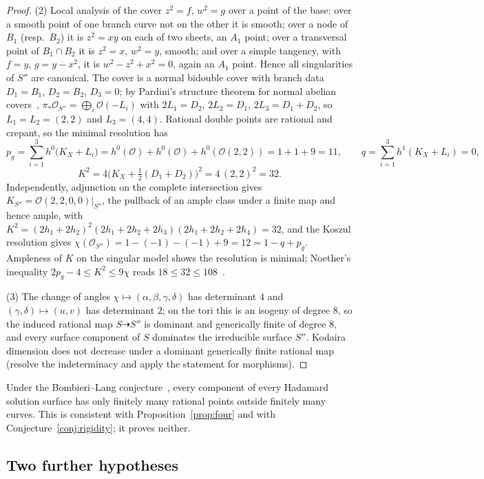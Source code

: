 \begin{proof}
(2) Local analysis of the cover $z^2=f$, $w^2=g$ over a point of the base: over a smooth point of one branch curve not on
the other it is smooth; over a node of $B_1$ (resp.\ $B_2$) it is $z^2=xy$ on each of two sheets, an $A_1$ point; over a
transversal point of $B_1\cap B_2$ it is $z^2=x$, $w^2=y$, smooth; and over a simple tangency, with $f=y$, $g=y-x^2$, it is
$w^2-z^2+x^2=0$, again an $A_1$ point. Hence all singularities of $S''$ are canonical. The cover is a normal bidouble cover
with branch data $D_1=B_1$, $D_2=B_2$, $D_3=0$; by Pardini's structure theorem for normal abelian covers~\cite{Pardini},
$\pi_*\mathcal O_{S''}=\bigoplus_i\mathcal O(-L_i)$ with $2L_1=D_2$, $2L_2=D_1$, $2L_3=D_1+D_2$, so $L_1=L_2=(2,2)$ and
$L_3=(4,4)$. Rational double points are rational and crepant, so the minimal resolution has
\[
p_g=\sum_{i=1}^{3}h^0\bigl(K_X+L_i\bigr)=h^0(\mathcal O)+h^0(\mathcal O)+h^0(\mathcal O(2,2))=1+1+9=11,\qquad
q=\sum_{i=1}^{3}h^1(K_X+L_i)=0,
\]
\[
K^2=4\bigl(K_X+\tfrac12(D_1+D_2)\bigr)^2=4\,(2,2)^2=32 .
\]
Independently, adjunction on the complete intersection gives $K_{S''}=\mathcal O(2,2,0,0)|_{S''}$, the pullback of an ample class
under a finite map and hence ample, with $K^2=(2h_1+2h_2)^2(2h_1+2h_2+2h_3)(2h_1+2h_2+2h_4)=32$, and the Koszul resolution
gives $\chi(\mathcal O_{S''})=1-(-1)-(-1)+9=12=1-q+p_g$. Ampleness of $K$ on the singular model shows the resolution is
minimal; Noether's inequality $2p_g-4\le K^2\le 9\chi$ reads $18\le32\le108$~\cite{BHPV}.

(3) The change of angles $\chi\mapsto(\alpha,\beta,\gamma,\delta)$ has determinant $4$ and $(\gamma,\delta)\mapsto(u,v)$
has determinant $2$; on the tori this is an isogeny of degree $8$, so the induced rational map $S\dashrightarrow S''$ is
dominant and generically finite of degree $8$, and every surface component of $S$ dominates the irreducible surface $S''$.
Kodaira dimension does not decrease under a dominant generically finite rational map (resolve the indeterminacy and apply
the statement for morphisms).
\end{proof}

\begin{corollary}
Under the Bombieri--Lang conjecture~\cite{Lang}, every component of every Hadamard solution surface has only finitely many
rational points outside finitely many curves. This is consistent with Proposition~\ref{prop:four} and with
Conjecture~\ref{conj:rigidity}; it proves neither.
\end{corollary}

\subsection{Two further hypotheses}

